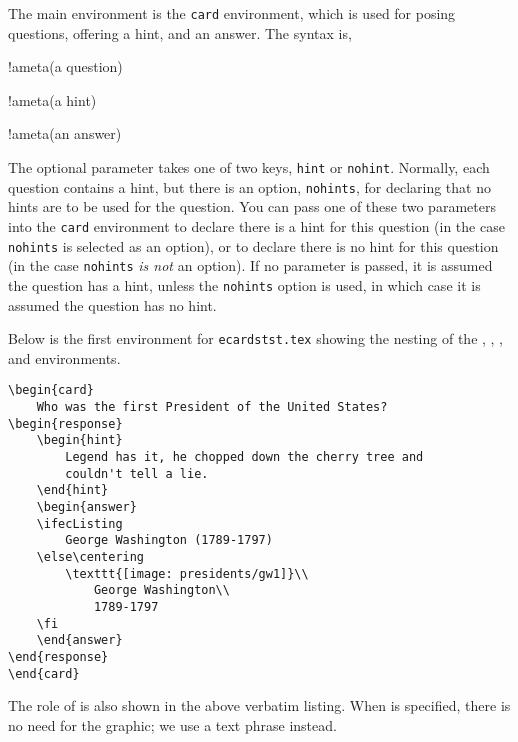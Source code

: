 \documentclass{article}
\begin{document}
The main environment is the \texttt{card} environment, which is used for posing
questions, offering a hint, and an answer. The \hypertarget{cardsyntax}{syntax} is,
\bVerb{}%
\begin{dCmd}[commandchars=!()]{\bxSize}
\begin{card}
  !ameta(a question)
  \begin{response}
      \begin{hint}
      !ameta(a hint)
      \end{hint}
      \begin{answer}
      !ameta(an answer)
      \end{answer}
  \end{response}
\end{card}
\end{dCmd}
\eVerb The optional parameter takes one of two keys,
\texttt{hint} or \texttt{nohint}. Normally, each question contains a hint,
but there is an option, \texttt{nohints}, for declaring that no hints are to
be used for the question. You can pass one of these two parameters into the
\texttt{card} environment to declare there is a hint for this question (in
the case \texttt{nohints} is selected as an option), or to declare there is
no hint for this question (in the case \texttt{nohints} \emph{is not} an
option).  If no parameter is passed, it is assumed the question has a hint,
unless the \texttt{nohints} option is used, in which case it is assumed the
question has no  hint.

Below is the first  environment for \texttt{ecardstst.tex} showing the nesting
of the , , , and  environments.
\begin{Verbatim}[xleftmargin=\amtIndent,fontsize=\small]
\begin{card}
    Who was the first President of the United States?
\begin{response}
    \begin{hint}
        Legend has it, he chopped down the cherry tree and
        couldn't tell a lie.
    \end{hint}
    \begin{answer}
    \ifecListing
        George Washington (1789-1797)
    \else\centering
        \texttt{[image: presidents/gw1]}\\
            George Washington\\
            1789-1797
    \fi
    \end{answer}
\end{response}
\end{card}
\end{Verbatim}
The role of  is also shown in the above verbatim listing.
When  is specified, there is no need for the graphic; we use a
text phrase instead.
\end{document}

